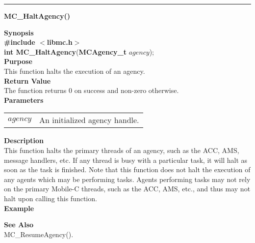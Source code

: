 \noindent
\vspace{5pt}
\rule{6.5in}{0.015in}
\noindent
{}
{\LARGE \bf MC\_HaltAgency()}\\
\label{api:MC_HaltAgency()}

\noindent
{\bf Synopsis}\\
{\bf \#include $<$libmc.h$>$}\\
{\bf int MC\_HaltAgency}({\bf MCAgency\_t} $agency$);\\

\noindent
{\bf Purpose}\\
This function halts the execution of an agency. \\

\noindent
{\bf Return Value}\\
The function returns 0 on success and non-zero otherwise.\\

\noindent
{\bf Parameters}
\vspace{-0.1in}
\begin{description}
\item
\begin{tabular}{p{10 mm}p{145 mm}} 
$agency$ & An initialized agency handle. 
\end{tabular}
\end{description}

\noindent
{\bf Description}\\
This function halts the primary threads of an agency, such as the ACC, AMS,
message handlers, etc. If any thread is busy with
a particular task, it will halt as soon as the task is finished. Note that
this function does not halt the execution of any agents which may be 
performing tasks. Agents performing tasks may not rely on the primary 
Mobile-C threads, such as the ACC, AMS, etc., and thus may not halt upon
calling this function. \\

\noindent
{\bf Example}\\
\noindent

\noindent
{\bf See Also}\\
MC\_ResumeAgency().

